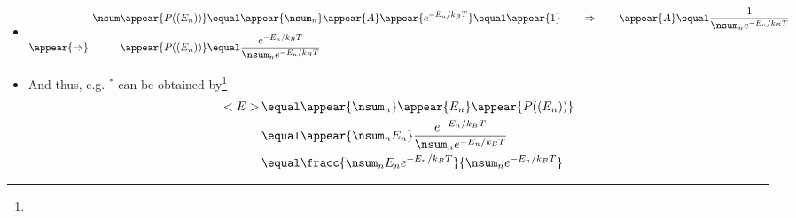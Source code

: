 \begin{frame}%
\frametitle{\texorpdfstring{\culine[\sectiontitleulinecolor]{\sectiontitle}}{\sectiontitle} }

\begin{itemize}
\item[] \[
\begin{aligned}
\nsum \appear{P \textrm{((} E_{n} \textrm{))}} &  \equal  \appear{\nsum_{n}} \appear{A} \appear{e^{-E_{n} / k_{B} T} } \equal  \appear{1} \qquad \Rightarrow \qquad \appear{A}  \equal \frac{1}{\nsum_{n} e^{-E_{n} / k_{B} T}} \\
 \appear{\Rightarrow} \qquad \quad \appear{P \textrm{((} E_{n} \textrm{))}} & \equal \frac{e^{-E_{n} / k_{B} T}}{\nsum_{n} e^{-E_{n} / k_{B} T}}
\end{aligned}
\]
\item And thus, e.g. $^*$ can be obtained by\footnote{{ }}
\[
\begin{aligned}
 < E >\, &  \equal \appear{\nsum_{n}} \appear{E_{n}} \appear{P \textrm{((} E_{n} \textrm{))}} \\
 & \equal \appear{\nsum_{n} E_{n}} \frac{e^{-E_{n} / k_{B} T}}{\nsum_{n} e^{-E_{n} / k_{B} T}} \\
 & \equal \fracc{\nsum_{n} E_{n} e^{-E_{n} / k_{B} T}}{\nsum_{n} e^{-E_{n} / k_{B} T}}
\end{aligned}
\]
\end{itemize}


\endofslide 
\end{frame}

